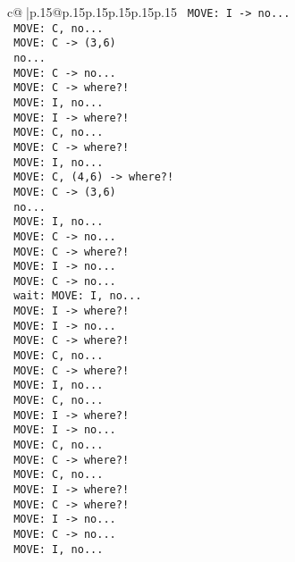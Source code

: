 \documentclass{article}
\begin{document}
{\begin{supertabular}{c@{$\;$}|p{.15\linewidth}@{}p{.15\linewidth}p{.15\linewidth}p{.15\linewidth}p{.15\linewidth}p{.15\linewidth}}
{{{\texttt{ MOVE: I {-}> no...} \\
\texttt{ MOVE: C, no...} \\
\texttt{ MOVE: C {-}> (3,6) } \\
\texttt{ no...} \\
\texttt{ MOVE: C {-}> no...} \\
\texttt{ MOVE: C {-}> where?!} \\
\texttt{ MOVE: I, no...} \\
\texttt{ MOVE: I {-}> where?!} \\
\texttt{ MOVE: C, no...} \\
\texttt{ MOVE: C {-}> where?!} \\
\texttt{ MOVE: I, no...} \\
\texttt{ MOVE: C, (4,6) {-}> where?!} \\
\texttt{ MOVE: C {-}> (3,6) } \\
\texttt{ no...} \\
\texttt{ MOVE: I, no...} \\
\texttt{ MOVE: C {-}> no...} \\
\texttt{ MOVE: C {-}> where?!} \\
\texttt{ MOVE: I {-}> no...} \\
\texttt{ MOVE: C {-}> no...} \\
\texttt{ wait: MOVE: I, no...} \\
\texttt{ MOVE: I {-}> where?!} \\
\texttt{ MOVE: I {-}> no...} \\
\texttt{ MOVE: C {-}> where?!} \\
\texttt{ MOVE: C, no...} \\
\texttt{ MOVE: C {-}> where?!} \\
\texttt{ MOVE: I, no...} \\
\texttt{ MOVE: C, no...} \\
\texttt{ MOVE: I {-}> where?!} \\
\texttt{ MOVE: I {-}> no...} \\
\texttt{ MOVE: C, no...} \\
\texttt{ MOVE: C {-}> where?!} \\
\texttt{ MOVE: C, no...} \\
\texttt{ MOVE: I {-}> where?!} \\
\texttt{ MOVE: C {-}> where?!} \\
\texttt{ MOVE: I {-}> no...} \\
\texttt{ MOVE: C {-}> no...} \\
\texttt{ MOVE: I, no...} \\
}}}
\end{supertabular}}
\end{document}
